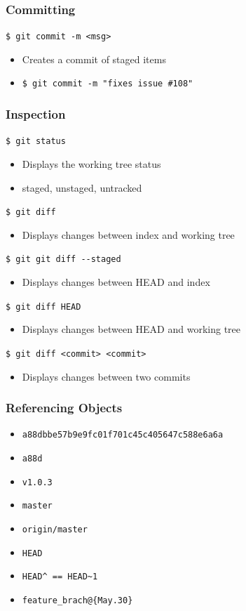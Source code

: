 \documentclass[english,compress]{beamer}
\begin{document}
\begin{frame}[fragile]
    \frametitle{Committing}

    \verb|$ git commit -m <msg>|
    \begin{itemize}
        \item Creates a commit of staged items
        \item \verb|$ git commit -m "fixes issue #108"|
    \end{itemize}
\end{frame}

\begin{frame}[fragile]
    \frametitle{Inspection}

    \verb|$ git status|
    \begin{itemize}
        \item Displays the working tree status
        \item staged, unstaged, untracked
    \end{itemize}
    \verb|$ git diff|
    \begin{itemize}
        \item Displays changes between index and working tree
    \end{itemize}
    \verb|$ git git diff --staged|
    \begin{itemize}
        \item Displays changes between HEAD and index
    \end{itemize}
    \verb|$ git diff HEAD|
    \begin{itemize}
        \item Displays changes between HEAD and working tree
    \end{itemize}
    \verb|$ git diff <commit> <commit>|
    \begin{itemize}
        \item Displays changes between two commits
    \end{itemize}
\end{frame}

\begin{frame}[fragile]
    \frametitle{Referencing Objects}

    \begin{itemize}
        \item \verb|a88dbbe57b9e9fc01f701c45c405647c588e6a6a|
        \item \verb|a88d|
        \item \verb|v1.0.3|
        \item \verb|master|
        \item \verb|origin/master|
        \item \verb|HEAD|
        \item \verb|HEAD^ == HEAD~1|
        \item \verb|feature_brach@{May.30}|
    \end{itemize}
\end{frame}
\end{document}
